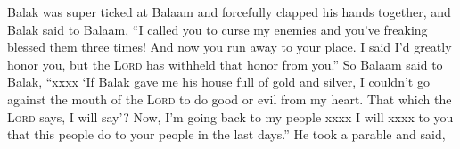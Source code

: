 
\begin{inparaenum}
    
    \pvbb{}{}%
    
    
    \pvbb{}{}%
    
    
    
    \pvbb{}{}%
    
    
    \pvbb{}{}%
    
    
    \pvcc{}{}{}%
    
    
    \pvbb{}{}%
    
     Balak was super ticked at Balaam and forcefully clapped his hands together, and Balak said to Balaam, ``I called you to curse my enemies and you've freaking blessed them three times!%
     And now you run away to your place. I said I'd greatly honor you, but the \textsc{Lord} has withheld that honor from you.''%
     So Balaam said to Balak, ``xxxx%
     `If Balak gave me his house full of gold and silver, I couldn't go against the mouth of the \textsc{Lord} to do good or evil from my heart. That which the \textsc{Lord} says, I will say'?%
     Now, I'm going back to my people xxxx I will xxxx to you that this people do to your people in the last days.''%
     He took a parable and said,%
    
    
    
    
    

\end{inparaenum}
